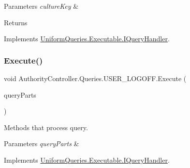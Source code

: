 \begin{DoxyParams}{Parameters}
{\em culture\+Key} & \\
\hline
\end{DoxyParams}
\begin{DoxyReturn}{Returns}

\end{DoxyReturn}


Implements \mbox{\hyperlink{interface_uniform_queries_1_1_executable_1_1_i_query_handler_ae0e55919571d5456af31298394d241a9}{Uniform\+Queries.\+Executable.\+I\+Query\+Handler}}.

\mbox{\label{class_authority_controller_1_1_queries_1_1_u_s_e_r___l_o_g_o_f_f_a2e4d5a0f8ee93210522c41a38adbcce2}} 
\subsubsection{\texorpdfstring{Execute()}{Execute()}}
{\footnotesize\ttfamily void Authority\+Controller.\+Queries.\+U\+S\+E\+R\+\_\+\+L\+O\+G\+O\+F\+F.\+Execute (\begin{DoxyParamCaption}\item[{\mbox{\hyperlink{struct_uniform_queries_1_1_query_part}{Query\+Part}} \mbox{[}$\,$\mbox{]}}]{query\+Parts }\end{DoxyParamCaption})}



Methods that process query. 


\begin{DoxyParams}{Parameters}
{\em query\+Parts} & \\
\hline
\end{DoxyParams}


Implements \mbox{\hyperlink{interface_uniform_queries_1_1_executable_1_1_i_query_handler_a3268d72c0388f5e3debba4d73bdfe523}{Uniform\+Queries.\+Executable.\+I\+Query\+Handler}}.

\mbox{\label{class_authority_controller_1_1_queries_1_1_u_s_e_r___l_o_g_o_f_f_afbfa78117d68ab2bd2728c78d31c1c58}} 
